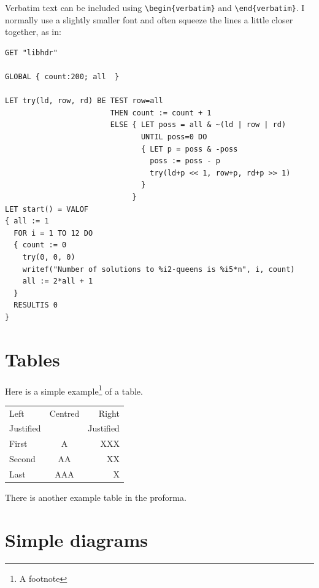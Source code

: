 \documentclass[12pt,a4paper,twoside,openright]{report}
\renewcommand{\baselinestretch}{1.1}    %
\begin{document}
Verbatim text can be included using \verb|\begin{verbatim}| and
\verb|\end{verbatim}|. I normally use a slightly smaller font and
often squeeze the lines a little closer together, as in:

{\renewcommand{\baselinestretch}{0.8}\small
\begin{verbatim}
GET "libhdr"
 
GLOBAL { count:200; all  }
 
LET try(ld, row, rd) BE TEST row=all
                        THEN count := count + 1
                        ELSE { LET poss = all & ~(ld | row | rd)
                               UNTIL poss=0 DO
                               { LET p = poss & -poss
                                 poss := poss - p
                                 try(ld+p << 1, row+p, rd+p >> 1)
                               }
                             }
LET start() = VALOF
{ all := 1
  FOR i = 1 TO 12 DO
  { count := 0
    try(0, 0, 0)
    writef("Number of solutions to %i2-queens is %i5*n", i, count)
    all := 2*all + 1
  }
  RESULTIS 0
}
\end{verbatim}
}

\section{Tables}

\begin{samepage}
Here is a simple example\footnote{A footnote} of a table.

\begin{center}
\begin{tabular}{l|c|r}
Left      & Centred & Right \\
Justified &         & Justified \\[3mm]
First     & A       & XXX \\
Second    & AA      & XX  \\
Last      & AAA     & X   \\
\end{tabular}
\end{center}

\noindent
There is another example table in the proforma.
\end{samepage}

\section{Simple diagrams}
\end{document}
